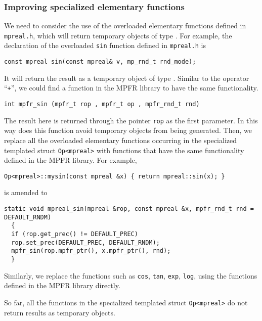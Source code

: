 \subsubsection{Improving specialized elementary functions}
We need to consider the use of the overloaded elementary functions defined in {\tt mpreal.h}, which will return temporary objects of type \mpreal. For example, the declaration of the overloaded \texttt{sin} function defined in {\tt mpreal.h} is
\begin{lstlisting}[numbers=none]
const mpreal sin(const mpreal& v, mp_rnd_t rnd_mode);
\end{lstlisting}
It will return the result as a temporary object of type \mpreal. Similar to the operator ``{\tt +}'', we could find a function in the MPFR library to have the same functionality.
\begin{lstlisting}[numbers=none]
int mpfr_sin (mpfr_t rop , mpfr_t op , mpfr_rnd_t rnd)
\end{lstlisting}
The result here is returned through the pointer \texttt{rop} as the first parameter. In this way does this function avoid temporary objects from being generated. Then, we replace all the overloaded elementary functions occurring in the specialized templated struct {\tt Op<mpreal>} with functions that have the same functionality defined in the MPFR library. For example,
\begin{lstlisting}[numbers=none]
Op<mpreal>::mysin(const mpreal &x) { return mpreal::sin(x); }
\end{lstlisting}
is amended to
\begin{lstlisting}[numbers=none]
  static void mpreal_sin(mpreal &rop, const mpreal &x, mpfr_rnd_t rnd = DEFAULT_RNDM)
  {
  if (rop.get_prec() != DEFAULT_PREC)
  rop.set_prec(DEFAULT_PREC, DEFAULT_RNDM);
  mpfr_sin(rop.mpfr_ptr(), x.mpfr_ptr(), rnd);
  }
\end{lstlisting}
Similarly, we replace the functions such as {\tt cos}, {\tt tan}, {\tt exp}, {\tt log}, using the functions defined in the MPFR library directly.

So far, all the functions in the specialized templated struct {\tt Op<mpreal>} do not return results as temporary objects.
